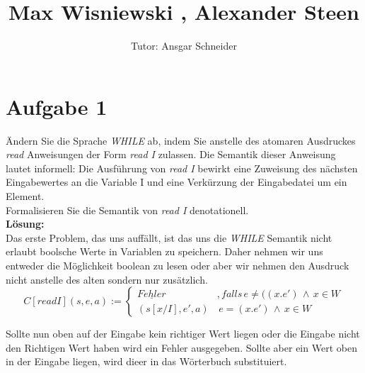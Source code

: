 \documentclass[11pt,a4paper,ngerman]{article}
\author{Tutor: Ansgar Schneider}
\date{}
\title{Max Wisniewski , Alexander Steen}
\begin{document}

\maketitle
\thispagestyle{fancy}



\section*{Aufgabe 1}

Ändern Sie die Sprache \emph{WHILE} ab, indem Sie anstelle des atomaren Ausdruckes \emph{read} Anweisungen
der Form \emph{read I} zulassen. Die Semantik dieser Anweisung lautet informell: Die Ausführung von \emph{read I} bewirkt eine Zuweisung des nächsten Eingabewertes an die Variable I und eine Verkürzung der Eingabedatei um ein Element.\\

Formalisieren Sie die Semantik von \emph{read I} denotationell.\\

\textbf{Lösung:}\\
Das erste Problem, das uns auffällt, ist das uns die \emph{WHILE} Semantik nicht erlaubt boolsche
Werte in Variablen zu speichern. Daher nehmen wir uns entweder die Möglichkeit boolean zu lesen
oder aber wir nehmen den Ausdruck nicht anstelle des alten sondern nur zusätzlich.\\

$$
C[read I](s,e,a) := \left\{
\begin{array}{lr}
\underline{Fehler} \;\;&,falls \, e\not= ((x.e')\, \land \, x \in W\\
(s[x/I],e',a) &\, e=(x.e') \, \land \, x \in W
\end{array}
\right.
$$

Sollte nun oben auf der Eingabe kein richtiger Wert liegen oder die Eingabe nicht den Richtigen Wert haben
wird ein Fehler ausgegeben. Sollte aber ein Wert oben in der Eingabe liegen, wird dieer in das Wörterbuch
substituiert.

\end{document}
